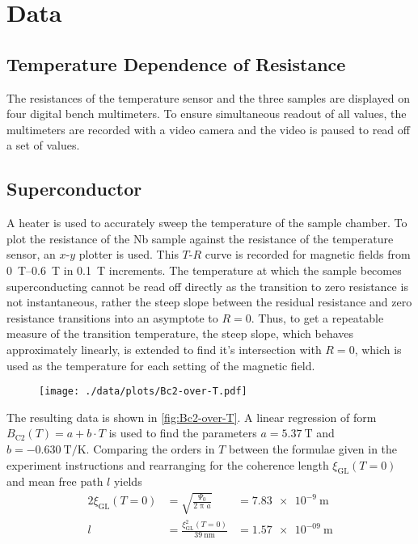 \chapter{Data}
\section{Temperature Dependence of Resistance}
The resistances of the temperature sensor and the three samples are displayed on four digital bench multimeters.
To ensure simultaneous readout of all values, the multimeters are recorded with a video camera and the video is paused to read off a set of values.

\section{Superconductor}
A heater is used to accurately sweep the temperature of the sample chamber.
To plot the resistance of the Nb sample against the resistance of the temperature sensor, an $x$-$y$ plotter is used.
This $T$-$R$ curve is recorded for magnetic fields from \SIrange{0}{0.6}{\tesla} in \SI{0.1}{\tesla} increments.
The temperature at which the sample becomes superconducting cannot be read off directly as the transition to zero resistance is not instantaneous, rather the steep slope between the residual resistance and zero resistance transitions into an asymptote to $R = 0$.
Thus, to get a repeatable measure of the transition temperature, the steep slope, which behaves approximately linearly, is extended to find it's intersection with $R = 0$, which is used as the temperature for each setting of the magnetic field.
\begin{figure}
	\centering
	\texttt{[image: ./data/plots/Bc2-over-T.pdf]}
	\label{fig:Bc2-over-T}
\end{figure}
The resulting data is shown in \autoref{fig:Bc2-over-T}.
A linear regression of form $B_\text{C2}(T) = a + b \cdot T$ is used to find the parameters $a = \SI{5.37}{\tesla}$ and $b = \SI{-0.630}{\tesla\per\kelvin}$.
Comparing the orders in $T$ between the formulae given in the experiment instructions and rearranging for the coherence length $\xi_\text{GL}(T = 0)$ and mean free path $l$ yields
\begin{alignat*}{2}
	\xi_\text{GL}(T = 0) &= \sqrt{\frac{\Psi_0}{2 \uppi a}} &= \SI{7.83e-9}{\meter}\\
	l &= \frac{\xi^2_\text{GL}(T = 0)}{\SI{39}{\nano\meter}} &= \SI{1.57e-09}{\meter}
\end{alignat*}
